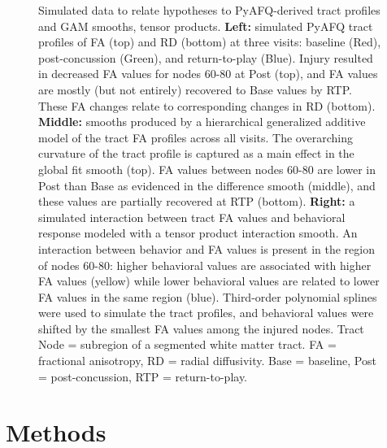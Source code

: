 \documentclass[12pt]{article}
\begin{document}
\begin{figure}[H]
	\centering
	\caption{Simulated data to relate hypotheses to PyAFQ-derived tract profiles and GAM smooths, tensor products. \textbf{Left:} simulated PyAFQ tract profiles of FA (top) and RD (bottom) at three visits: baseline (Red), post-concussion (Green), and return-to-play (Blue). Injury resulted in decreased FA values for nodes 60-80 at Post (top), and FA values are mostly (but not entirely) recovered to Base values by RTP. These FA changes relate to corresponding changes in RD (bottom). \textbf{Middle:} smooths produced by a hierarchical generalized additive model of the tract FA profiles across all visits. The overarching curvature of the tract profile is captured as a main effect in the global fit smooth (top). FA values between nodes 60-80 are lower in Post than Base as evidenced in the difference smooth (middle), and these values are partially recovered at RTP (bottom). \textbf{Right:} a simulated interaction between tract FA values and behavioral response modeled with a tensor product interaction smooth. An interaction between behavior and FA values is present in the region of nodes 60-80: higher behavioral values are associated with higher FA values (yellow) while lower behavioral values are related to lower FA values in the same region (blue). Third-order polynomial splines were used to simulate the tract profiles, and behavioral values were shifted by the smallest FA values among the injured nodes. Tract Node = subregion of a segmented white matter tract. FA = fractional anisotropy, RD = radial diffusivity. Base = baseline, Post = post-concussion, RTP = return-to-play.}
	\label{fig:intro-hyp}
\end{figure}


\section{Methods}
\label{sec:meth}
\end{document}
